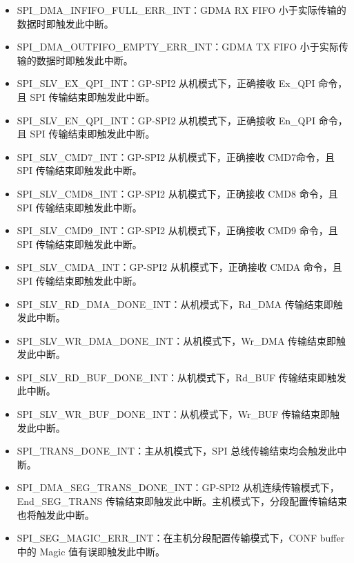 \documentclass[main\_\_CN.tex]{subfiles}
\begin{document}
\begin{itemize}
\item \label{int:SPIINFIFOFULLERRINT}SPI\_DMA\_INFIFO\_FULL\_ERR\_INT：GDMA RX FIFO 小于实际传输的数据时即触发此中断。
\item \label{int:SPIOUTFIFOEMPTYERRINT}SPI\_DMA\_OUTFIFO\_EMPTY\_ERR\_INT：GDMA TX FIFO 小于实际传输的数据时即触发此中断。

\item \label{int:SPISLVEXQPIINT} SPI\_SLV\_EX\_QPI\_INT：GP-SPI2 从机模式下，正确接收 Ex\_QPI 命令，且 SPI 传输结束即触发此中断。
\item \label{int:SPISLVENQPIINT} SPI\_SLV\_EN\_QPI\_INT：GP-SPI2 从机模式下，正确接收 En\_QPI 命令，且 SPI 传输结束即触发此中断。
\item \label{int:SPISLVCMD7INT} SPI\_SLV\_CMD7\_INT：GP-SPI2 从机模式下，正确接收 CMD7命令，且 SPI 传输结束即触发此中断。
\item \label{int:SPISLVCMD8INT} SPI\_SLV\_CMD8\_INT：GP-SPI2 从机模式下，正确接收 CMD8 命令，且 SPI 传输结束即触发此中断。
\item \label{int:SPISLVCMD9INT} SPI\_SLV\_CMD9\_INT：GP-SPI2 从机模式下，正确接收 CMD9 命令，且 SPI 传输结束即触发此中断。
\item \label{int:SPISLVCMDAINT} SPI\_SLV\_CMDA\_INT：GP-SPI2 从机模式下，正确接收 CMDA 命令，且 SPI 传输结束即触发此中断。

\item \label{int:SPISLVRDDMADONEINT}SPI\_SLV\_RD\_DMA\_DONE\_INT：从机模式下，Rd\_DMA 传输结束即触发此中断。
\item \label{int:SPISLVWRDMADONEINT}SPI\_SLV\_WR\_DMA\_DONE\_INT：从机模式下，Wr\_DMA 传输结束即触发此中断。
\item \label{int:SPISLVRDBUFDONEINT}SPI\_SLV\_RD\_BUF\_DONE\_INT：从机模式下，Rd\_BUF 传输结束即触发此中断。
\item \label{int:SPISLVWRBUFDONEINT}SPI\_SLV\_WR\_BUF\_DONE\_INT：从机模式下，Wr\_BUF 传输结束即触发此中断。

\item \label{int:SPITRANSDONEINT}SPI\_TRANS\_DONE\_INT：主从机模式下，SPI 总线传输结束均会触发此中断。
\item \label{int:SPIDMASEGTRANSDONEINT}SPI\_DMA\_SEG\_TRANS\_DONE\_INT：GP-SPI2 从机连续传输模式下，End\_SEG\_TRANS 传输结束即触发此中断。主机模式下，分段配置传输结束也将触发此中断。
\item \label{int:SPISEGMAGICERRINT} SPI\_SEG\_MAGIC\_ERR\_INT：在主机分段配置传输模式下，CONF buffer 中的 Magic 值有误即触发此中断。



\end{itemize}
\end{document}
